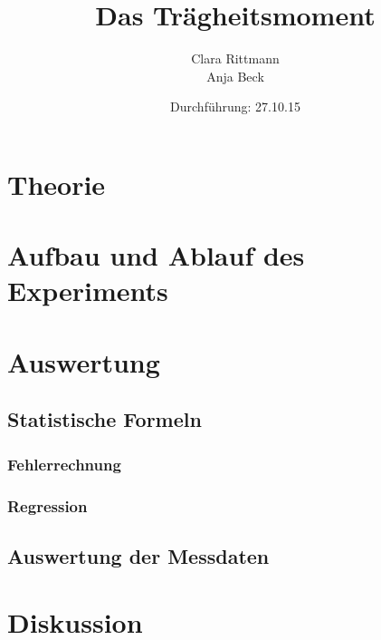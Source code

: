 \documentclass[a4,12pt]{article}
\title{Das Trägheitsmoment}
\author{Clara Rittmann \\ Anja Beck}
\date{Durchführung: 27.10.15}
\begin{document}
	\maketitle
	\date{}
\newpage
	\tableofcontents
\newpage

	\section{Theorie}
	
\newpage

	\section{Aufbau und Ablauf des Experiments}
	
\newpage

	\section{Auswertung}
	\subsection{Statistische Formeln}
	\subsubsection{Fehlerrechnung}
	
	\subsubsection{Regression}
	
	\subsection{Auswertung der Messdaten}
	
\newpage
	\section{Diskussion}
	
\end{document}
